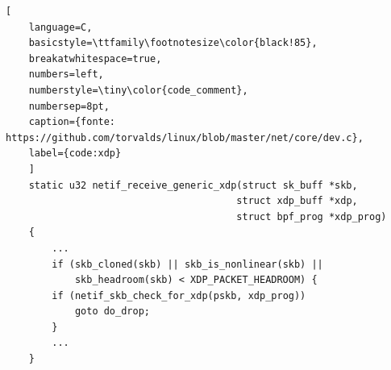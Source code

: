 \documentclass[12pt,a4paper,twoside]{book}
\begin{document}
\begin{onehalfspace}
\begin{lstlisting}[
    language=C,
    basicstyle=\ttfamily\footnotesize\color{black!85},
    breakatwhitespace=true,
    numbers=left,
    numberstyle=\tiny\color{code_comment},
    numbersep=8pt,
    caption={fonte: https://github.com/torvalds/linux/blob/master/net/core/dev.c},
    label={code:xdp}
    ]
    static u32 netif_receive_generic_xdp(struct sk_buff *skb,
                                        struct xdp_buff *xdp,
                                        struct bpf_prog *xdp_prog)
    {
        ...
        if (skb_cloned(skb) || skb_is_nonlinear(skb) ||
            skb_headroom(skb) < XDP_PACKET_HEADROOM) {
        if (netif_skb_check_for_xdp(pskb, xdp_prog))
            goto do_drop;
        }
        ...
    }
\end{lstlisting}


\end{onehalfspace}
\end{document}
